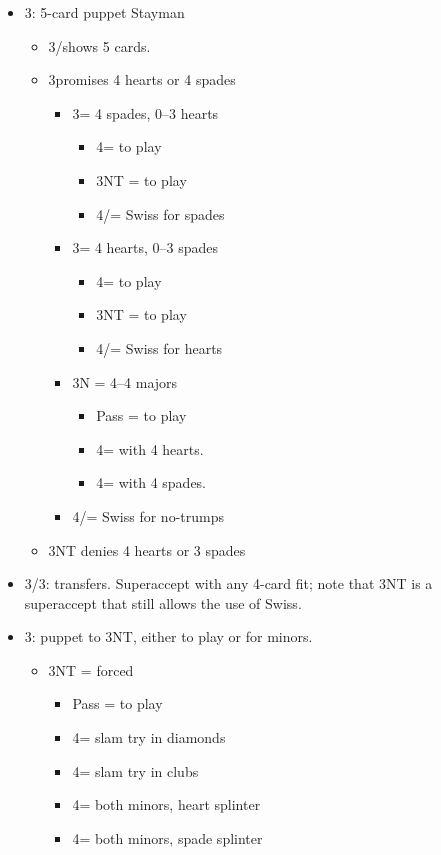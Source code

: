 \documentclass[a4paper,14pt]{extarticle}
\begin{document}
\begin{itemize}
\label{note:8}
\item 3\clubs: 5-card puppet Stayman
	\begin{itemize}
   \item 3\hearts/\spades shows 5 cards.
   \item 3\diamonds promises 4 hearts or 4 spades
		\begin{itemize}
      \item 3\hearts = 4 spades, 0--3 hearts
			\begin{itemize}
         \item 4\spades = to play
			\item 3NT = to play
			\item 4\clubs/\diamonds = Swiss  for spades
			\end{itemize}
      \item 3\spades = 4 hearts, 0--3 spades
			\begin{itemize}
         \item 4\hearts = to play
			\item 3NT = to play
			\item 4\clubs/\diamonds = Swiss  for hearts
			\end{itemize}
      \item 3N = 4--4 majors
			\begin{itemize}
			\item Pass = to play
         \item 4\hearts = with 4 hearts.
         \item 4\spades = with 4 spades.
			\end{itemize}
		\item 4\clubs/\diamonds = Swiss  for no-trumps
		\end{itemize}
   \item 3NT denies 4 hearts or 3 spades
	\end{itemize}

\item 3\diamonds/3\hearts: transfers. Superaccept with any 4-card fit; note that 3NT is a
superaccept that still allows the use of Swiss.

\label{note:10}
\item 3\spades: puppet to 3NT, either to play or for minors.
	\begin{itemize}
   \item 3NT = forced
		\begin{itemize}
		\item Pass = to play
		\item 4\clubs = slam try in diamonds
		\item 4\diamonds = slam try in clubs
		\item 4\hearts = both minors, heart splinter
		\item 4\spades = both minors, spade splinter
		\end{itemize}
	\end{itemize}


\end{itemize}
\end{document}
